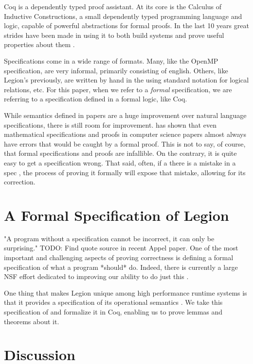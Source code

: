 \documentclass[sigplan]{acmart}
\begin{document}
Coq is a dependently typed proof assistant. At its core is the Calculus of
Inductive Constructions, a small dependently typed programming language and
logic, capable of powerful abstractions for formal proofs. In the last 10 years 
great strides have been made in using it to both build systems and prove useful
properties about them \cite{compcert, certicoq, chlipala...}. 

Specifications come in a wide range of formats. Many, like the OpenMP
specification, are very informal, primarily consisting of english. Others, like
Legion's previously, are written by hand in the using standard notation for
logical relations, etc. For this paper, when we refer to a \emph{formal}
specification, we are referring to a specification defined in a formal logic,
like Coq. 

While semantics defined in papers are a huge improvement over natural language
specifications, there is still room for improvement. \cite{formalspec vs paper} has 
shown that even mathematical specifications and proofs in computer science
papers almost always have errors that would be caught by a formal proof. This is not to say,
of course, that formal specifications and proofs are infallible. On the contrary, it 
is quite easy to get a specification wrong. That said, often, if a there is a mistake in a spec
, the process of proving it formally will expose that mistake, allowing for its correction. 

\section{A Formal Specification of Legion}

"A program without a specification cannot be incorrect, it can only be
surprising." TODO: Find quote source in recent Appel paper. One of the most
important and challenging aspects of proving correctness is defining a formal
specification of what a program *should* do. Indeed, there is currently a large
NSF effort dedicated to improving our ability to do just this \cite{deepspec}. 

One thing that makes Legion unique among high performance runtime systems is
that it provides a specification of its operational semantics \cite{oopsla13}.
We take this specification of and formalize it in Coq, enabling us to prove
lemmas and theorems about it.

\section{Discussion}
\end{document}
